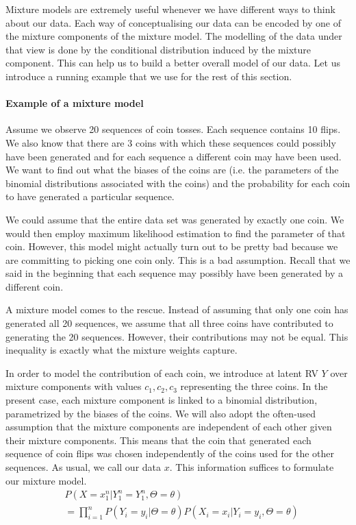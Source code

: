 \documentclass[a4paper,11pt,leqno]{report}\usepackage[]{graphicx}\usepackage[]{color}
\begin{document}
Mixture models are extremely useful whenever we have different ways to think about our data. Each way
of conceptualising our data can be encoded by one of the mixture components of the mixture model. The modelling
of the data under that view is done by the conditional distribution induced by the mixture component.
This can help us to build a better overall model of our data. Let us introduce a running example that
we use for the rest of this section. 

\paragraph{Example of a mixture model} Assume we observe 20 sequences of coin tosses. Each sequence
contains 10 flips. We also know that there are 3 coins with which these sequences could possibly have been
generated and for each sequence a different coin may have been used. We want to find out what the biases
of the coins are (i.e. the parameters of the binomial distributions associated with the coins) and the probability
for each coin to have generated a particular sequence.
 
We could assume that the entire data set was generated by exactly one coin. We would then employ maximum likelihood estimation 
to find the parameter of that coin. However, this model might actually turn out to be
pretty bad because we are committing to picking one coin only. This is a bad assumption. Recall that we said in the beginning that
each sequence may possibly have been generated by a different coin. 

A mixture model comes to the rescue. Instead of assuming that only one coin has generated all 20 sequences,
we assume that all three coins have contributed to generating the 20 sequences. However, their contributions
may not be equal. This inequality is exactly what the mixture weights capture. 

In order to model the contribution of each coin, we introduce at latent RV $ Y $ over mixture components with values $ c_{1}, c_{2}, c_{3} $ representing the three coins.
In the present case, each mixture component is linked to a binomial distribution, parametrized by the biases of
the coins. We will also adopt the often-used assumption
that the mixture components are independent of each other given their mixture components. This means that the coin that generated each
sequence of coin flips was chosen independently of the coins used for the other sequences. As usual, we call our data $ x $. 
This information suffices to formulate our mixture model.
\begin{align} 
&P(X=x_{1}^{n}|Y_{1}^{n}=Y_{1}^{n},\Theta=\theta) \label{eq:mixtureExample} \\
&= \prod_{i=1}^{n} P(Y_{i}= y_{i}|\Theta=\theta)P(X_{i}=x_{i}|Y_{i}=y_{i},\Theta=\theta) \nonumber 
\end{align}
\end{document}
